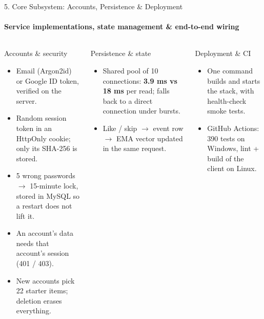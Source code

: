 \documentclass[aspectratio=169, 11pt]{beamer}
\begin{document}
\begin{frame}{5. Core Subsystem: Accounts, Persistence \& Deployment}
    \framesubtitle{Service implementations, state management \& end-to-end wiring}
    \begin{columns}[T]
        \begin{block}{Accounts \& security}
            \scriptsize
            \begin{itemize}
                \item Email (Argon2id) or Google ID token, verified on the server.
                \item Random session token in an HttpOnly cookie; only its SHA-256 is stored.
                \item 5 wrong passwords $\rightarrow$ 15-minute lock, stored in MySQL so a restart does not lift it.
                \item An account's data needs that account's session (401 / 403).
                \item New accounts pick 22 starter items; deletion erases everything.
            \end{itemize}
        \end{block}
        \begin{block}{Persistence \& state}
            \scriptsize
            \begin{itemize}
                \item Shared pool of 10 connections: \textbf{3.9 ms vs 18 ms} per read; falls back to a direct connection under bursts.
                \item Like / skip $\rightarrow$ event row $\rightarrow$ EMA vector updated in the same request.
            \end{itemize}
        \end{block}
        \begin{block}{Deployment \& CI}
            \scriptsize
            \begin{itemize}
                \item One command builds and starts the stack, with health-check smoke tests.
                \item GitHub Actions: 390 tests on Windows, lint + build of the client on Linux.
            \end{itemize}
        \end{block}
    \end{columns}
\end{frame}
\end{document}
